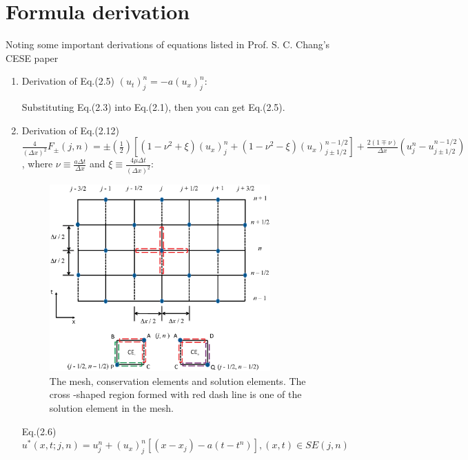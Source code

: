 \documentclass[a4paper,12pt]{article}
\begin{document}
\section{Formula derivation}
 \label{sec:formula_derivation}
Noting some important derivations of equations listed in Prof. S. C. Chang's 
CESE paper~\cite{CESE_Shin_Chung_Chang_1995}
 \begin{enumerate}
  \item Derivation of Eq.(2.5) $(u_t)^n_j = -a(u_x)^n_j$:

    \hspace{4mm}Substituting Eq.(2.3) into Eq.(2.1), then you can get Eq.(2.5).

  \item Derivation of Eq.(2.12) \newline
    $\frac{4}{(\Delta x)^{2}}F_{\pm}(j, n)=
    \pm(\frac{1}{2})[(1-\nu^{2}+\xi)(u_{x})^{n}_{j}
    +(1-\nu^{2}-\xi)(u_{x})^{n-1/2}_{j\pm1/2}]
    +\frac{2(1\mp\nu)}{\Delta x}(u^{n}_{j}-u^{n-1/2}_{j\pm1/2})$, 
    where $\nu\equiv\frac{a\Delta t}{\Delta x}$ 
    and $\xi\equiv\frac{4\mu\Delta t}{(\Delta x)^{2}}$:
    \begin{figure}[hbtp]
     \centering
      \includegraphics[width=0.8\textwidth]{mesh_and_ce_se_v1.eps}
      \caption{The mesh, conservation elements and solution elements. The cross
               -shaped region formed with red dash line is one of the solution 
               element in the mesh.}
     \label{fig:mesh_and_ce_se_v1}
    \end{figure}

    \hspace{4mm}Eq.(2.6) $u^{*}(x,t;j,n)=u^{n}_{j}+(u_{x})^{n}_{j}[(x-x_{j})
                         -a(t-t^{n})], (x,t)\in SE(j,n)$


\end{enumerate}
\end{document}
